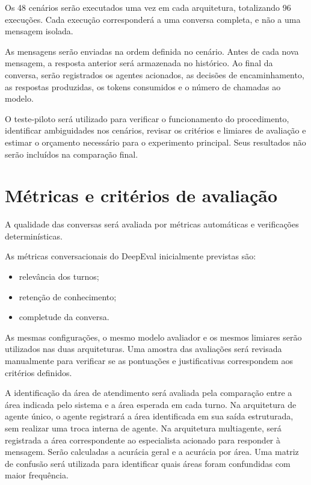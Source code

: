 Os 48 cenários serão executados uma vez em cada arquitetura, totalizando 96 execuções. Cada execução corresponderá a uma conversa completa, e não a uma mensagem isolada.

As mensagens serão enviadas na ordem definida no cenário. Antes de cada nova mensagem, a resposta anterior será armazenada no histórico. Ao final da conversa, serão registrados os agentes acionados, as decisões de encaminhamento, as respostas produzidas, os tokens consumidos e o número de chamadas ao modelo.

O teste-piloto será utilizado para verificar o funcionamento
do procedimento, identificar ambiguidades nos cenários, 
revisar os critérios e limiares de avaliação e estimar
o orçamento necessário para o experimento principal.
Seus resultados não serão incluídos na comparação final.

\section{Métricas e critérios de avaliação}\label{sec:metricas}

A qualidade das conversas será avaliada por métricas automáticas e verificações determinísticas.

As métricas conversacionais do DeepEval inicialmente previstas são:

\begin{itemize}
    \item relevância dos turnos;
    \item retenção de conhecimento;
    \item completude da conversa.
\end{itemize}

As mesmas configurações, o mesmo modelo avaliador e os mesmos limiares serão utilizados nas duas arquiteturas. Uma amostra das avaliações será revisada manualmente para verificar se as pontuações e justificativas correspondem aos critérios definidos.

A identificação da área de atendimento será avaliada pela comparação
entre a área indicada pelo sistema e a área esperada em cada turno.
Na arquitetura de agente único, o agente registrará a área identificada
em sua saída estruturada, sem realizar uma troca interna de agente.
Na arquitetura multiagente, será registrada a área correspondente
ao especialista acionado para responder à mensagem. Serão calculadas
a acurácia geral e a acurácia por área. Uma matriz de confusão será
utilizada para identificar quais áreas foram confundidas com maior
frequência.

